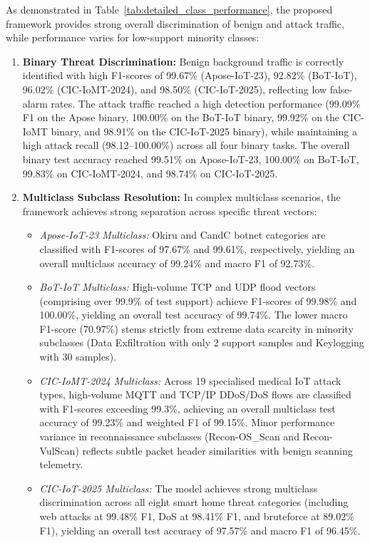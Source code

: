 \documentclass[a4paper,fleqn]{cas-sc}
\begin{document}
As demonstrated in Table~\ref{tab:detailed_class_performance}, the proposed framework provides strong overall discrimination of benign and attack traffic, while performance varies for low-support minority classes:
\begin{enumerate}
    \item \textbf{Binary Threat Discrimination:} Benign background traffic is correctly identified with high F1-scores of 99.67\% (Apose-IoT-23), 92.82\% (BoT-IoT), 96.02\% (CIC-IoMT-2024), and 98.50\% (CIC-IoT-2025), reflecting low false-alarm rates. The attack traffic reached a high detection performance (99.09\% F1 on the Apose binary, 100.00\% on the BoT-IoT binary, 99.92\% on the CIC-IoMT binary, and 98.91\% on the CIC-IoT-2025 binary), while maintaining a high attack recall (98.12--100.00\%) across all four binary tasks. The overall binary test accuracy reached 99.51\% on Apose-IoT-23, 100.00\% on BoT-IoT, 99.83\% on CIC-IoMT-2024, and 98.74\% on CIC-IoT-2025.
    
    \item \textbf{Multiclass Subclass Resolution:} In complex multiclass scenarios, the framework achieves strong separation across specific threat vectors:
    \begin{itemize}
        \item \textit{Apose-IoT-23 Multiclass:} Okiru and CandC botnet categories are classified with F1-scores of 97.67\% and 99.61\%, respectively, yielding an overall multiclass accuracy of 99.24\% and macro F1 of 92.73\%.
        \item \textit{BoT-IoT Multiclass:} High-volume TCP and UDP flood vectors (comprising over 99.9\% of test support) achieve F1-scores of 99.98\% and 100.00\%, yielding an overall test accuracy of 99.74\%. The lower macro F1-score (70.97\%) stems strictly from extreme data scarcity in minority subclasses (Data Exfiltration with only 2 support samples and Keylogging with 30 samples).
        \item \textit{CIC-IoMT-2024 Multiclass:} Across 19 specialised medical IoT attack types, high-volume MQTT and TCP/IP DDoS/DoS flows are classified with F1-scores exceeding 99.3\%, achieving an overall multiclass test accuracy of 99.23\% and weighted F1 of 99.15\%. Minor performance variance in reconnaissance subclasses (Recon-OS\_Scan and Recon-VulScan) reflects subtle packet header similarities with benign scanning telemetry.
        \item \textit{CIC-IoT-2025 Multiclass:} The model achieves strong multiclass discrimination across all eight smart home threat categories (including web attacks at 99.48\% F1, DoS at 98.41\% F1, and bruteforce at 89.02\% F1), yielding an overall test accuracy of 97.57\% and macro F1 of 96.45\%.
    \end{itemize}
\end{enumerate}
\end{document}
